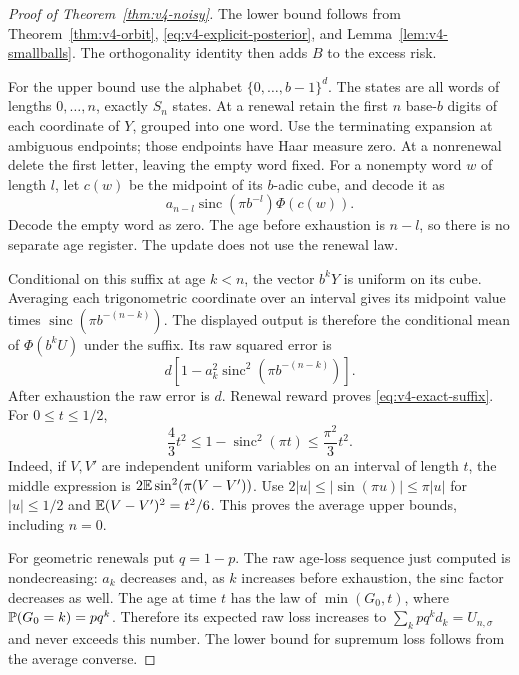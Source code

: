 \begin{proof}[Proof of Theorem~\ref{thm:v4-noisy}]
The lower bound follows from Theorem~\ref{thm:v4-orbit},
\eqref{eq:v4-explicit-posterior}, and
Lemma~\ref{lem:v4-smallballs}. The orthogonality identity then adds
$B$ to the excess risk.

For the upper bound use the alphabet $\{0,\ldots,b-1\}^d$.
The states are all words of lengths $0,\ldots,n$, exactly $S_n$ states.
At a renewal retain the first $n$ base-$b$ digits of each coordinate
of $Y$, grouped into one word. Use the terminating expansion at
ambiguous endpoints; those endpoints have Haar measure zero.
At a nonrenewal delete the first letter, leaving the empty word fixed.
For a nonempty word $w$ of length $l$, let $c(w)$ be the midpoint of
its $b$-adic cube, and decode it as
\[
 a_{n-l}\operatorname{sinc}(\pi b^{-l})\Phi(c(w)).
\]
Decode the empty word as zero. The age before exhaustion is $n-l$,
so there is no separate age register. The update does not use the
renewal law.

Conditional on this suffix at age $k<n$, the vector $b^kY$ is
uniform on its cube. Averaging each trigonometric coordinate over
an interval gives its midpoint value times
$\operatorname{sinc}(\pi b^{-(n-k)})$. The displayed output is
therefore the conditional mean of $\Phi(b^kU)$ under the suffix.
Its raw squared error is
\[
 d\left[1-a_k^2\operatorname{sinc}^2(\pi b^{-(n-k)})\right].
\]
After exhaustion the raw error is $d$. Renewal reward proves
\eqref{eq:v4-exact-suffix}. For $0\le t\le1/2$,
\begin{equation}
 \frac43t^2\le1-\operatorname{sinc}^2(\pi t)
                 \le\frac{\pi^2}{3}t^2.                        \label{eq:v4-sinc-bounds}
\end{equation}
Indeed, if $V,V'$ are independent uniform variables on an interval
of length $t$, the middle expression is
$2\mathbb E\sin^2(\pi(V-V'))$. Use
$2|u|\le|\sin(\pi u)|\le\pi|u|$ for $|u|\le1/2$ and
$\mathbb E(V-V')^2=t^2/6$. This proves the average upper bounds,
including $n=0$.

For geometric renewals put $q=1-p$. The raw age-loss sequence just
computed is nondecreasing: $a_k$ decreases and, as $k$ increases
before exhaustion, the sinc factor decreases as well. The age at
time $t$ has the law of $\min(G_0,t)$, where
$\mathbb P(G_0=k)=pq^k$. Therefore its expected raw loss increases to
$\sum_kpq^kd_k=U_{n,\sigma}$ and never exceeds this number.
The lower bound for supremum loss follows from the average converse.
\end{proof}


